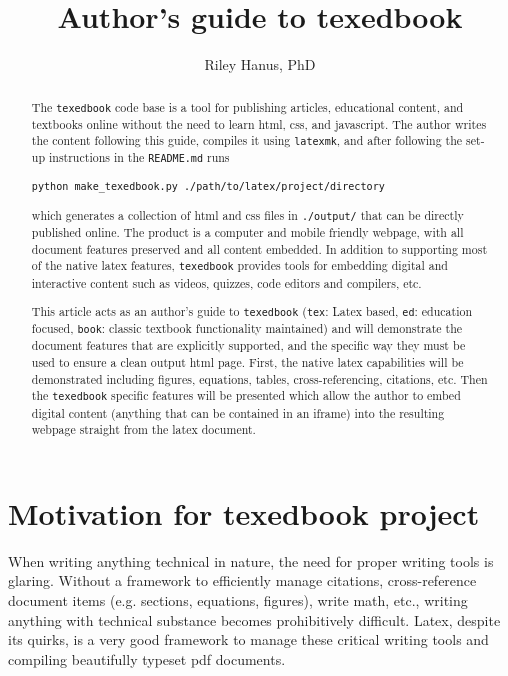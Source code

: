 \documentclass{article}
\title{Author's guide to texedbook}
\author{Riley Hanus, PhD}
\date{}
\begin{document}
 
\maketitle

\begin{abstract}
The \verb'texedbook' code base is a tool for publishing articles, educational content, and textbooks online without the need to learn html, css, and javascript. The author writes the content following this guide, compiles it using \verb'latexmk', and after following the set-up instructions in the \verb'README.md' runs 
\begin{verbatim}
python make_texedbook.py ./path/to/latex/project/directory
\end{verbatim}
which generates a collection of html and css files in \verb'./output/' that can be directly published online. The product is a computer and mobile friendly webpage, with all document features preserved and all content embedded.  In addition to supporting most of the native latex features, \verb'texedbook' provides tools for embedding digital and interactive content such as videos, quizzes, code editors and compilers, etc. 

This article acts as an author's guide to \verb'texedbook' (\verb'tex': Latex based, \verb'ed': education focused, \verb'book': classic textbook functionality maintained) and will demonstrate the document features that are explicitly supported, and the specific way they must be used to ensure a clean output html page.  First, the native latex capabilities will be demonstrated including figures, equations, tables, cross-referencing, citations, etc. Then the \verb'texedbook' specific features will be presented which allow the author to embed digital content (anything that can be contained in an iframe) into the resulting webpage straight from the latex document. 
\end{abstract}

\section{Motivation for texedbook project}

When writing anything technical in nature, the need for proper writing tools is glaring. Without a framework to efficiently manage citations, cross-reference document items (e.g. sections, equations, figures), write math, etc., writing anything with technical substance becomes prohibitively difficult. Latex, despite its quirks, is a very good framework to manage these critical writing tools and compiling beautifully typeset pdf documents.
\end{document}

